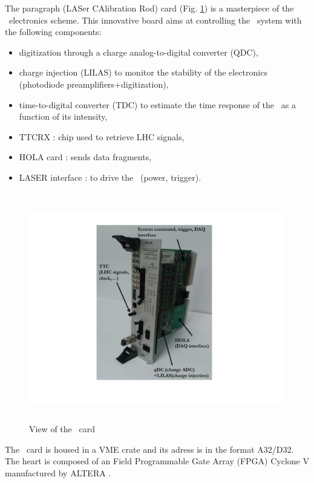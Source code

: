 The paragraph (LASer CAlibration Rod) card (Fig. \ref{fig:laslascar}) is a masterpiece of the \lasii~electronics scheme. This innovative board aims at controlling the \las~system with the following components:
\begin{itemize}

\item digitization through a charge analog-to-digital converter (QDC),

\item charge injection (LILAS) to monitor the stability of the electronics (photodiode preamplifiers+digitization),

\item time-to-digital converter (TDC) to estimate the time response of the \las~as a function of its intensity,

\item TTCRX : chip used to retrieve LHC signals,

\item HOLA card : sends data fragments,

\item LASER interface : to drive the \las~(power, trigger).

\end{itemize}

\begin{figure}[htbp]

\centering
\includegraphics[height=10cm]{figures/Lascar_photo_black.pdf}
\caption{View of the \lascar~card}\label{fig:laslascar}
\end{figure}

The \lascar~card is housed in a VME crate and its adress is in the format A32/D32. The heart is composed of an Field Programmable Gate Array (FPGA) Cyclone V manufactured by ALTERA \cite{ref:altera-cyclone}.

